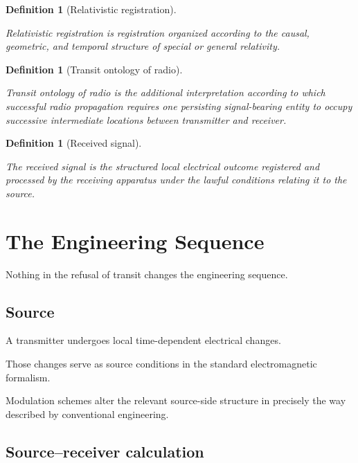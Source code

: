 \documentclass[12pt,onecolumn]{article}
\newtheorem{definition}[proposition]{Definition}
\begin{document}
\begin{definition}[Relativistic registration]
\label{def:relregistration}

Relativistic registration is registration organized according to the
causal, geometric, and temporal structure of special or general
relativity.

\end{definition}

\begin{definition}[Transit ontology of radio]
\label{def:transit}

Transit ontology of radio is the additional interpretation according to
which successful radio propagation requires one persisting
signal-bearing entity to occupy successive intermediate locations between
transmitter and receiver.

\end{definition}

\begin{definition}[Received signal]
\label{def:receivedsignal}

The received signal is the structured local electrical outcome
registered and processed by the receiving apparatus under the lawful
conditions relating it to the source.

\end{definition}

\section{The Engineering Sequence}

Nothing in the refusal of transit changes the engineering sequence.

\subsection*{Source}

A transmitter undergoes local time-dependent electrical changes.

Those changes serve as source conditions in the standard electromagnetic
formalism.

Modulation schemes alter the relevant source-side structure in precisely
the way described by conventional engineering.

\subsection*{Source--receiver calculation}
\end{document}
